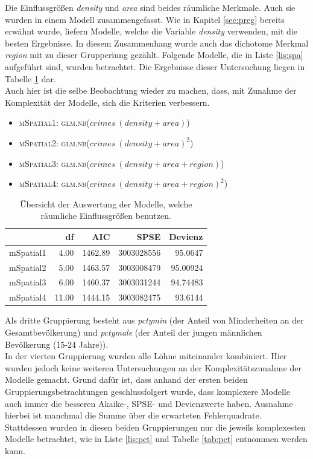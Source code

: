\par\smallskip
Die Einflussgr\"o\ss{}en \textit{density} und \textit{area} sind beides r\"aumliche Merkmale. Auch sie wurden in einem Modell zusammengefasst.
Wie in Kapitel \ref{sec:preg} bereits erw\"ahnt wurde, liefern Modelle, welche die Variable \textit{density} verwenden, mit die besten Ergebnisse.
In diesem Zusammenhang wurde auch das dichotome Merkmal \textit{region} mit zu dieser Grupperiung gez\"ahlt.
Folgende Modelle, die in Liste \ref{lis:spa} aufgef\"uhrt sind, wurden betrachtet.
Die Ergebnisse dieser Untersuchung liegen in Tabelle \ref{tab:spa} dar. \\
Auch hier ist die selbe Beobachtung wieder zu machen, dass, mit Zunahme der Komplexit\"at der Modelle, sich die Kriterien verbessern.

\begin{itemize}
\item \textsc{mSpatial1: glm.nb($crimes~(density+area)$)}
\item \textsc{mSpatial2: glm.nb($crimes~(density+area)^2$)}
\item \textsc{mSpatial3: glm.nb($crimes~(density+area+region)$)}
\item \textsc{mSpatial4: glm.nb($crimes~(density+area+region)^2$)}
\label{lis:spa}
\end{itemize}

\begin{table}[ht]
\centering
\begin{tabular}{rrrrr}
  \hline
 & df & AIC & SPSE & Devienz\\ 
  \hline
  mSpatial1 & 4.00 & 1462.89 & 3003028556 & 95.0647\\ 
  mSpatial2 & 5.00 & 1463.57 & 3003008479 & 95.00924\\ 
  mSpatial3 & 6.00 & 1460.37 & 3003031244 & 94.74483\\ 
  mSpatial4 & 11.00 & 1444.15 & 3003082475 & 93.6144\\ 
   \hline
\end{tabular}
\caption{\"Ubersicht der Auswertung der Modelle, welche r\"aumliche Einflussgr\"o\ss{}en benutzen.}
\label{tab:spa}
\end{table}

\par\smallskip
Als dritte Gruppierung besteht aus \textit{pctymin} (der Anteil von Minderheiten an der Gesamtbev\"olkerung) und \textit{pctymale} (der Anteil der jungen m\"annlichen Bev\"olkerung (15-24 Jahre)). 
\\
In der vierten Gruppierung wurden alle L\"ohne miteinander kombiniert.
Hier wurden jedoch keine weiteren Untersuchungen an der Komplexit\"atszunahme der Modelle gemacht.
Grund daf\"ur ist, dass anhand der ersten beiden Gruppierungsbetrachtungen geschlussfolgert wurde, dass komplexere Modelle auch immer die besseren Akaike-, SPSE- und Devienzwerte haben.
Ausnahme hierbei ist manchmal die Summe \"uber die erwarteten Fehlerquadrate. \\
Stattdessen wurden in diesen beiden Gruppierungen nur die jeweils komplexesten Modelle betrachtet, wie in Liste \ref{lis:pct} und Tabelle \ref{tab:pct} entnommen werden kann.


